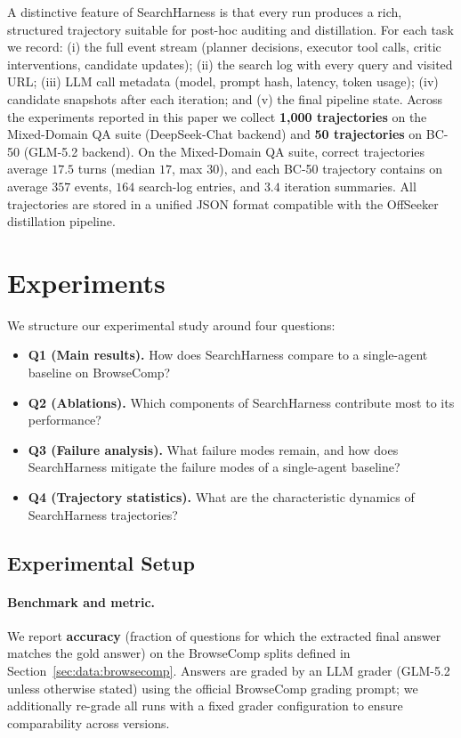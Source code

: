 A distinctive feature of SearchHarness is that every run produces a rich, structured trajectory suitable for post-hoc auditing and distillation.
For each task we record:
(i) the full event stream (planner decisions, executor tool calls, critic interventions, candidate updates);
(ii) the search log with every query and visited URL;
(iii) LLM call metadata (model, prompt hash, latency, token usage);
(iv) candidate snapshots after each iteration; and
(v) the final pipeline state.
Across the experiments reported in this paper we collect \textbf{1{,}000 trajectories} on the Mixed-Domain QA suite (DeepSeek-Chat backend) and \textbf{50 trajectories} on BC-50 (GLM-5.2 backend).
On the Mixed-Domain QA suite, correct trajectories average $17.5$ turns (median $17$, max $30$), and each BC-50 trajectory contains on average $357$ events, $164$ search-log entries, and $3.4$ iteration summaries.
All trajectories are stored in a unified JSON format compatible with the OffSeeker distillation pipeline.

\section{Experiments}
\label{sec:exp}

We structure our experimental study around four questions:
\begin{itemize}
  \item \textbf{Q1 (Main results).} How does SearchHarness compare to a single-agent baseline on BrowseComp?
  \item \textbf{Q2 (Ablations).} Which components of SearchHarness contribute most to its performance?
  \item \textbf{Q3 (Failure analysis).} What failure modes remain, and how does SearchHarness mitigate the failure modes of a single-agent baseline?
  \item \textbf{Q4 (Trajectory statistics).} What are the characteristic dynamics of SearchHarness trajectories?
\end{itemize}

\subsection{Experimental Setup}
\label{sec:exp:setup}

\paragraph{Benchmark and metric.}
We report \textbf{accuracy} (fraction of questions for which the extracted final answer matches the gold answer) on the BrowseComp splits defined in Section~\ref{sec:data:browsecomp}.
Answers are graded by an LLM grader (GLM-5.2 unless otherwise stated) using the official BrowseComp grading prompt; we additionally re-grade all runs with a fixed grader configuration to ensure comparability across versions.

